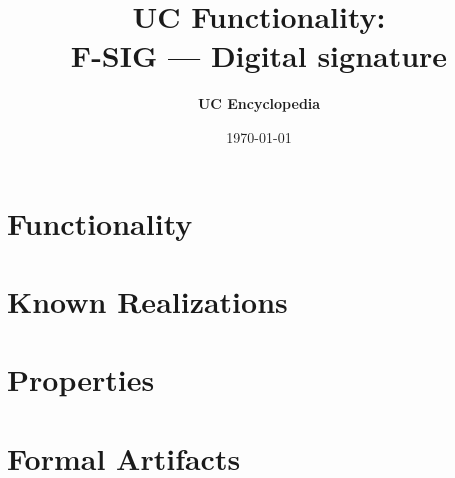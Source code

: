 \documentclass[11pt,a4paper]{article}
\title{\textbf{\Large UC Functionality:}\\[0.2em] \Large F-SIG --- Digital signature}
\author{\textbf{UC Encyclopedia}}
\date{\today}
\newtheorem{functionality}{Functionality}
\begin{document}
\maketitle

\begin{abstract}
\end{abstract}

\section{Functionality}

%

\section{Known Realizations}


\section{Properties}


\section{Formal Artifacts}

\end{document}
